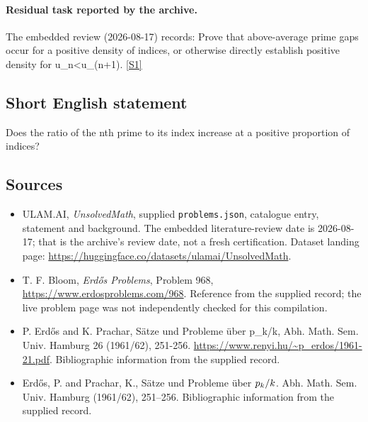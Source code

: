 \documentclass[11pt,a4paper]{article}
\newcommand{\sref}[2]{\hyperlink{source:#1:#2}{[S#2]}}
\begin{document}
\paragraph{Residual task reported by the archive.}

The embedded review (2026-08-17) records: Prove that above-average prime gaps occur for a positive density of indices, or otherwise directly establish positive density for u\_n<u\_(n+1). \sref{statement}{1}

\subsection{Short English statement}

Does the ratio of the nth prime to its index increase at a positive proportion of indices?

\subsection{Sources}

{\small

\begin{itemize}

\item[\hypertarget{source:statement:1}{S1}] ULAM.AI, \emph{UnsolvedMath}, supplied \texttt{problems.json}, catalogue entry, statement and background. The embedded literature-review date is 2026-08-17; that is the archive’s review date, not a fresh certification. Dataset landing page: \url{https://huggingface.co/datasets/ulamai/UnsolvedMath}.

\item[\hypertarget{source:statement:2}{S2}] T. F. Bloom, \emph{Erdős Problems}, Problem 968, \url{https://www.erdosproblems.com/968}. Reference from the supplied record; the live problem page was not independently checked for this compilation.

\item[\hypertarget{source:statement:3}{S3}] P. Erdős and K. Prachar, Sätze und Probleme über p\_k/k, Abh. Math. Sem. Univ. Hamburg 26 (1961/62), 251-256. \url{https://www.renyi.hu/~p_erdos/1961-21.pdf}. Bibliographic information from the supplied record.

\item[\hypertarget{source:statement:4}{S4}] Erd\H{o}s, P. and Prachar, K., S\"{a}tze und {P}robleme \"{u}ber {$p\sb{k}/k$}. Abh. Math. Sem. Univ. Hamburg (1961/62), 251--256. Bibliographic information from the supplied record.

\end{itemize}

}

\label{end:statement}
\end{document}

